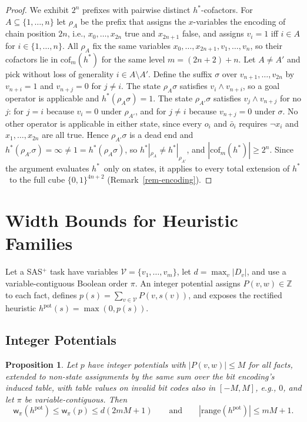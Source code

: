 \documentclass[letterpaper]{article}
\newcommand{\vars}{\ensuremath{\mathcal{V}}}
\newcommand{\hstar}{\ensuremath{h^{*}}}
\newcommand{\hpot}{\ensuremath{h^{\text{pot}}}}
\newcommand{\width}{\ensuremath{\mathsf{w}}}
\newcommand{\sub}[2]{\ensuremath{\mathrm{cof}_{#1}(#2)}}
\newcommand{\hrange}{\ensuremath{\mathrm{range}}}
\theoremstyle{plain}
\newtheorem{proposition}{Proposition}
\theoremstyle{definition}
\theoremstyle{remark}
\begin{document}
\begin{proof}
We exhibit $2^n$ prefixes with pairwise distinct \hstar-cofactors. For
$A \subseteq \{1, \dots, n\}$ let $\rho_A$ be the prefix that assigns
the $x$-variables the encoding of chain position $2n$, i.e.,
$x_0, \dots, x_{2n}$ true and $x_{2n+1}$ false, and assigns $v_i = 1$
iff $i \in A$ for $i \in \{1, \dots, n\}$. All $\rho_A$ fix the same
variables $x_0, \dots, x_{2n+1}, v_1, \dots, v_n$, so their cofactors
lie in $\sub{m}{\hstar}$ for the same level $m = (2n + 2) + n$. Let
$A \neq A'$ and pick without loss of generality
$i \in A \setminus A'$. Define the suffix $\sigma$ over
$v_{n+1}, \dots, v_{2n}$ by $v_{n+i} = 1$ and $v_{n+j} = 0$ for
$j \neq i$. The state $\rho_A \sigma$ satisfies
$v_i \wedge v_{n+i}$, so a goal operator is applicable and
$\hstar(\rho_A \sigma) = 1$. The state $\rho_{A'} \sigma$ satisfies
$v_j \wedge v_{n+j}$ for no $j$: for $j = i$ because $v_i = 0$ under
$\rho_{A'}$, and for $j \neq i$ because $v_{n+j} = 0$ under $\sigma$.
No other operator is applicable in either state, since every $o_i$ and
$\bar o_i$ requires $\neg x_i$ and $x_1, \dots, x_{2n}$ are all true.
Hence $\rho_{A'} \sigma$ is a dead
end and $\hstar(\rho_{A'} \sigma) = \infty \neq 1 =
\hstar(\rho_A \sigma)$, so
$\hstar|_{\rho_A} \neq \hstar|_{\rho_{A'}}$, and
$|\sub{m}{\hstar}| \geq 2^{n}$. Since the argument evaluates \hstar\
only on states, it applies to every total extension of \hstar\ to
the full cube $\{0,1\}^{4n+2}$ (Remark~\ref{rem-encoding}).
\end{proof}

\section{Width Bounds for Heuristic Families}

Let a SAS$^+$ task have variables $\vars=\{v_1,\dots,v_m\}$, let
$d=\max_v|D_v|$, and use a variable-contiguous Boolean order $\pi$.
An integer potential assigns $P(v,w)\in\mathbb Z$ to each fact, defines
$p(s)=\sum_{v\in\vars}P(v,s(v))$, and exposes the rectified heuristic
$\hpot(s)=\max(0,p(s))$.

\subsection{Integer Potentials}

\begin{proposition}
\label{prop-pot}
Let $p$ have integer potentials with $|P(v,w)|\leq M$ for all facts,
extended to non-state assignments by the same sum over the bit
encoding's induced table, with table values on invalid bit codes also
in $[-M,M]$, e.g., $0$, and let $\pi$ be variable-contiguous. Then
\[
\width_\pi(\hpot)\leq\width_\pi(p)\leq d(2mM+1)
\qquad\text{and}\qquad
|\hrange(\hpot)|\leq mM+1.
\]
\end{proposition}
\end{document}
